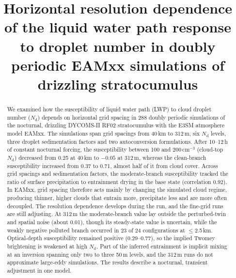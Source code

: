 \documentclass[acp, manuscript]{copernicus}
\newcommand{\Nd}{N_\mathrm{d}}
\newcommand{\cmthree}{\mathrm{cm^{-3}}}
\begin{document}
\title{Horizontal resolution dependence of the liquid water path response to droplet number in doubly periodic EAMxx simulations of drizzling stratocumulus}





\received{}
\pubdiscuss{}
\revised{}
\accepted{}
\published{}


\maketitle

\begin{abstract}
We examined how the susceptibility of liquid water path (LWP) to cloud droplet number ($\Nd$) depends on horizontal grid spacing in 288 doubly periodic simulations of the nocturnal, drizzling DYCOMS-II RF02 stratocumulus with the E3SM atmosphere model EAMxx. The simulations span grid spacings from 40\,km to 312\,m, six $\Nd$ levels, three droplet sedimentation factors and two autoconversion formulations. After 10--12\,h of constant nocturnal forcing, the susceptibility between 100 and 200\,$\cmthree$ (cloud-top $\Nd$) decreased from 0.25 at 40\,km to $-0.05$ at 312\,m, whereas the clean-branch susceptibility increased from 0.37 to 0.71, almost half of it from cloud cover. Across grid spacings and sedimentation factors, the moderate-branch susceptibility tracked the ratio of surface precipitation to entrainment drying in the base state (correlation 0.92). In EAMxx, grid spacing therefore acts mainly by changing the simulated cloud regime, producing thinner, higher clouds that entrain more, precipitate less and are more often decoupled. The resolution dependence develops during the run, and the fine-grid runs are still adjusting. At 312\,m the moderate-branch value lay outside the perturbed-twin and spatial noise (about 0.01), though its steady-state value is uncertain, while the weakly negative polluted branch occurred in 23 of 24 configurations at $\le$2.5\,km. Optical-depth susceptibility remained positive (0.29--0.77), so the implied Twomey brightening is weakened at high $\Nd$. Part of the inferred entrainment is implicit mixing at an inversion spanning only two to three 50\,m levels, and the 312\,m runs do not approximate large-eddy simulations. The results describe a nocturnal, transient adjustment in one model.
\end{abstract}
\end{document}
